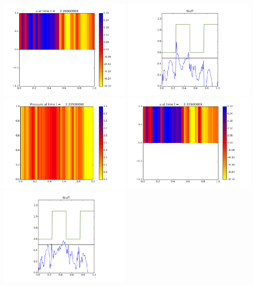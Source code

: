 \documentclass[11pt]{article}
\begin{document}
\includegraphics[width=0.475\textwidth]{frame0088fig1.png}
\vskip 10pt 
\includegraphics[width=0.475\textwidth]{frame0088fig3.png}
\vskip 10pt 
\includegraphics[width=0.475\textwidth]{frame0089fig0.png}
\includegraphics[width=0.475\textwidth]{frame0089fig1.png}
\vskip 10pt 
\includegraphics[width=0.475\textwidth]{frame0089fig3.png}
\end{document}
